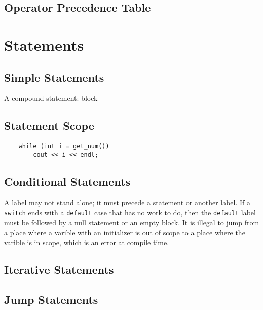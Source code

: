 \documentclass[11pt]{ctexart}
\begin{document}
\subsection{Operator Precedence Table}
\section{Statements}
\subsection{Simple Statements}
A compound statement: block
\subsection{Statement Scope}
\begin{lstlisting}
    while (int i = get_num())
        cout << i << endl;
\end{lstlisting}
\subsection{Conditional Statements}
A label may not stand alone; it must precede a statement or another label. If a \verb|switch| ends with a \verb|default| case that has no work to do, then the \verb|default| label must be followed by a null statement or an empty block. It is illegal to jump from a place where a varible with an initializer is out of scope to a place where the varible is in scope, which is an error at compile time.
\subsection{Iterative Statements}
\subsection{Jump Statements}
\end{document}
